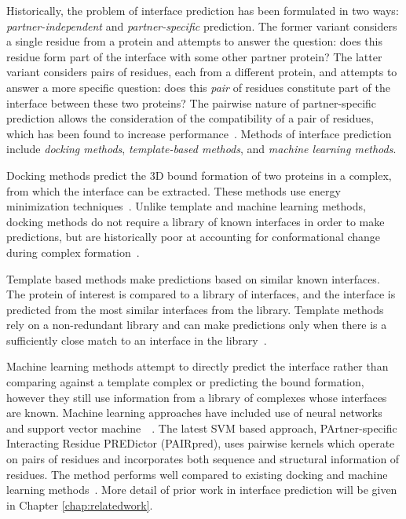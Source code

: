 Historically, the problem of interface prediction has been formulated in two ways: \textit{partner-independent} and \textit{partner-specific} prediction.
The former variant considers a single residue from a protein and attempts to answer the question: does this residue form part of the interface with some other partner protein?
The latter variant considers pairs of residues, each from a different protein, and attempts to answer a more specific question: does this \textit{pair} of residues constitute part of the interface between these two proteins?
The pairwise nature of partner-specific prediction allows the consideration of the compatibility of a pair of residues, which has been found to increase performance~\cite{ahmad2011, minhas2014}.
Methods of interface prediction include \textit{docking methods}, \textit{template-based methods}, and \textit{machine learning methods}.

Docking methods predict the 3D bound formation of two proteins in a complex, from which the interface can be extracted. 
These methods use energy minimization techniques~\cite{chen2003, zundert2016}.
Unlike template and machine learning methods, docking methods do not require a library of known interfaces in order to make predictions, but are historically poor at accounting for conformational change during complex formation~\cite{ezkurdia2009}.

Template based methods make predictions based on similar known interfaces.
The protein of interest is compared to a library of interfaces, and the interface is predicted from the most similar interfaces from the library.
Template methods rely on a non-redundant library and can make predictions only when there is a sufficiently close match to an interface in the library~\cite{tuncbag2011}.

Machine learning methods attempt to directly predict the interface rather than comparing against a template complex or predicting the bound formation, however they still use information from a library of complexes whose interfaces are known.
Machine learning approaches have included use of neural networks and support vector machine~\cite{ahmad2011}~\cite{minhas2014}.
The latest SVM based approach, PArtner-specific Interacting Residue PREDictor (PAIRpred), uses pairwise kernels which operate on pairs of residues and incorporates both sequence and structural information of residues.
The method performs well compared to existing docking and machine learning methods~\cite{minhas2014}. More detail of prior work in interface prediction will be given in Chapter \ref{chap:relatedwork}.